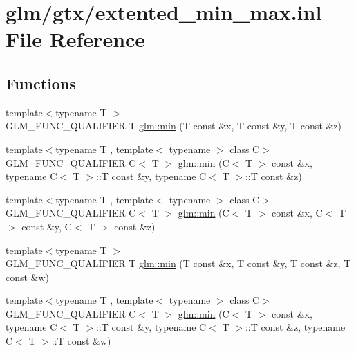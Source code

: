 \hypertarget{extented__min__max_8inl}{\section{glm/gtx/extented\-\_\-min\-\_\-max.inl File Reference}
\label{extented__min__max_8inl}
}
\subsection*{Functions}
\begin{DoxyCompactItemize}
\item 
{\footnotesize template$<$typename T $>$ }\\G\-L\-M\-\_\-\-F\-U\-N\-C\-\_\-\-Q\-U\-A\-L\-I\-F\-I\-E\-R T \hyperlink{group__gtx__extented__min__max_ga713d3f9b3e76312c0d314e0c8611a6a6}{glm\-::min} (T const \&x, T const \&y, T const \&z)
\item 
{\footnotesize template$<$typename T , template$<$ typename $>$ class C$>$ }\\G\-L\-M\-\_\-\-F\-U\-N\-C\-\_\-\-Q\-U\-A\-L\-I\-F\-I\-E\-R C$<$ T $>$ \hyperlink{group__gtx__extented__min__max_ga74d1a96e7cdbac40f6d35142d3bcbbd4}{glm\-::min} (C$<$ T $>$ const \&x, typename C$<$ T $>$\-::T const \&y, typename C$<$ T $>$\-::T const \&z)
\item 
{\footnotesize template$<$typename T , template$<$ typename $>$ class C$>$ }\\G\-L\-M\-\_\-\-F\-U\-N\-C\-\_\-\-Q\-U\-A\-L\-I\-F\-I\-E\-R C$<$ T $>$ \hyperlink{group__gtx__extented__min__max_ga42b5c3fc027fd3d9a50d2ccc9126d9f0}{glm\-::min} (C$<$ T $>$ const \&x, C$<$ T $>$ const \&y, C$<$ T $>$ const \&z)
\item 
{\footnotesize template$<$typename T $>$ }\\G\-L\-M\-\_\-\-F\-U\-N\-C\-\_\-\-Q\-U\-A\-L\-I\-F\-I\-E\-R T \hyperlink{group__gtx__extented__min__max_ga95466987024d03039607f09e69813d69}{glm\-::min} (T const \&x, T const \&y, T const \&z, T const \&w)
\item 
{\footnotesize template$<$typename T , template$<$ typename $>$ class C$>$ }\\G\-L\-M\-\_\-\-F\-U\-N\-C\-\_\-\-Q\-U\-A\-L\-I\-F\-I\-E\-R C$<$ T $>$ \hyperlink{group__gtx__extented__min__max_ga4fe35dd31dd0c45693c9b60b830b8d47}{glm\-::min} (C$<$ T $>$ const \&x, typename C$<$ T $>$\-::T const \&y, typename C$<$ T $>$\-::T const \&z, typename C$<$ T $>$\-::T const \&w)
\item 

\end{DoxyCompactItemize}
